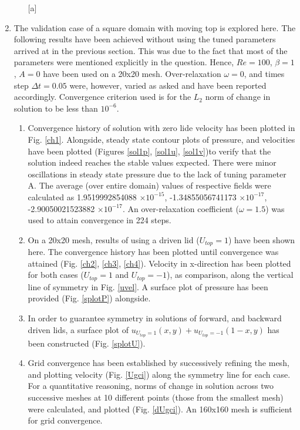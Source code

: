 \documentclass[a4paper, 10pt]{article}
\begin{document}
\begin{enumerate}[I]
\begin{enumerate} [a]


  \end{enumerate}

\item The validation case of a square domain with moving top is explored here. The following results have been achieved without using the tuned parameters arrived at in the previous section. This was due to the fact that most of the parameters were mentioned explicitly in the question. Hence, $Re = 100$, $\beta = 1$, $A = 0$ have been used on a 20x20 mesh. Over-relaxation $\omega = 0$, and times step $\Delta t = 0.05$ were, however, varied as asked and have been reported accordingly. Convergence criterion used is for the $L_2$ norm of change in solution to be less than $10^{-6}$.
  \begin{enumerate} [a]
  \item Convergence history of solution with zero lide velocity has been plotted in Fig. \ref{ch1}. Alongside, steady state contour plots of pressure, and velocities have been plotted (Figures \ref{sol1p}, \ref{sol1u}, \ref{sol1v})to verify that the solution indeed reaches the stable values expected. There were minor oscillations in steady state pressure due to the lack of tuning parameter A. The average (over entire domain) values of respective fields were calculated as 1.9519992854088 $\times 10^{-15}$, -1.34855056741173 $\times 10^{-17}$, -2.90050021523882 $\times 10^{-17}$. An over-relaxation coefficient ($\omega = 1.5$) was used to attain convergence in 224 steps.
  \item On a 20x20 mesh, results of using a driven lid ($U_{top} = 1$) have been shown here. The convergence history has been plotted until convergence was attained (Fig. \ref{ch2}, \ref{ch3}, \ref{ch4}). Velocity in x-direction has been plotted for both cases ($U_{top} = 1$ and $U_{top} = -1$), as comparison, along the vertical line of symmetry in Fig. \ref{uvel}. A surface plot of pressure has been provided (Fig. \ref{splotP}) alongside.
  \item In order to guarantee symmetry in solutions of forward, and backward driven lids, a surface plot of $u_{U_{top} = 1}(x,y) + u_{U_{top} = -1}(1-x,y)$ has been constructed (Fig. \ref{splotU}).
  \item Grid convergence has been established by successively refining the mesh, and plotting velocity (Fig. \ref{Ugci}) along the symmetry line for each case. For a quantitative reasoning, norms of change in solution across two successive meshes at 10 different points (those from the smallest mesh) were calculated, and plotted (Fig. \ref{dUgci}). An 160x160 mesh is sufficient for grid convergence.
  \end{enumerate}
  

\end{enumerate}
\end{document}
